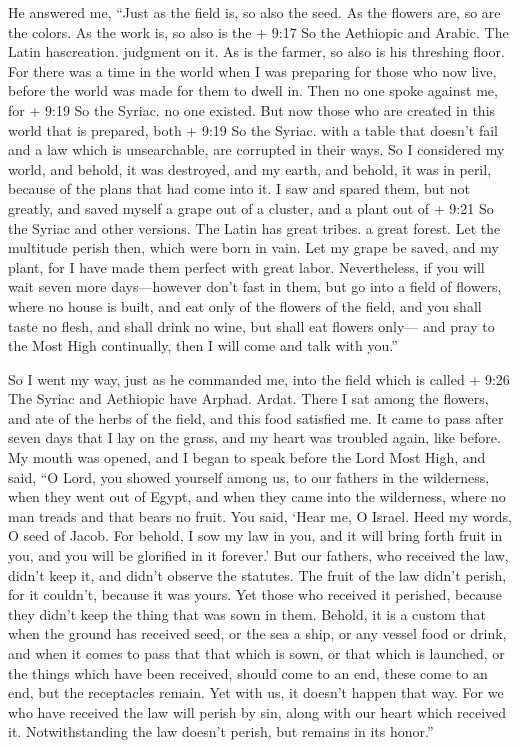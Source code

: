  He answered me, ``Just as the field is, so also the seed.
As the flowers are, so are the colors. As the work is, so also is the +
9:17 So the Aethiopic and Arabic. The Latin hascreation. judgment on it.
As is the farmer, so also is his threshing floor. For there was a time
in the world  when I was preparing for those who now live,
before the world was made for them to dwell in. Then no one spoke
against me,  for + 9:19 So the Syriac. no one existed. But
now those who are created in this world that is prepared, both + 9:19 So
the Syriac. with a table that doesn't fail and a law which is
unsearchable, are corrupted in their ways.  So I considered
my world, and behold, it was destroyed, and my earth, and behold, it was
in peril, because of the plans that had come into it.  I
saw and spared them, but not greatly, and saved myself a grape out of a
cluster, and a plant out of + 9:21 So the Syriac and other versions. The
Latin has great tribes. a great forest.  Let the multitude
perish then, which were born in vain. Let my grape be saved, and my
plant, for I have made them perfect with great labor. 
Nevertheless, if you will wait seven more days---however don't fast in
them,  but go into a field of flowers, where no house is
built, and eat only of the flowers of the field, and you shall taste no
flesh, and shall drink no wine, but shall eat flowers only---
 and pray to the Most High continually, then I will come
and talk with you.''

 So I went my way, just as he commanded me, into the field
which is called + 9:26 The Syriac and Aethiopic have Arphad. Ardat.
There I sat among the flowers, and ate of the herbs of the field, and
this food satisfied me.  It came to pass after seven days
that I lay on the grass, and my heart was troubled again, like before.
 My mouth was opened, and I began to speak before the Lord
Most High, and said,  ``O Lord, you showed yourself among
us, to our fathers in the wilderness, when they went out of Egypt, and
when they came into the wilderness, where no man treads and that bears
no fruit.  You said, `Hear me, O Israel. Heed my words, O
seed of Jacob.  For behold, I sow my law in you, and it
will bring forth fruit in you, and you will be glorified in it forever.'
 But our fathers, who received the law, didn't keep it, and
didn't observe the statutes. The fruit of the law didn't perish, for it
couldn't, because it was yours.  Yet those who received it
perished, because they didn't keep the thing that was sown in them.
 Behold, it is a custom that when the ground has received
seed, or the sea a ship, or any vessel food or drink, and when it comes
to pass that that which is sown, or that which is launched,
 or the things which have been received, should come to an
end, these come to an end, but the receptacles remain. Yet with us, it
doesn't happen that way.  For we who have received the law
will perish by sin, along with our heart which received it.
 Notwithstanding the law doesn't perish, but remains in its
honor.''


